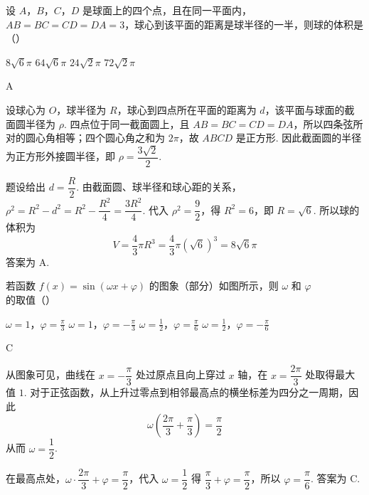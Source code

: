 \begin{problem}
设 \(A\)，\(B\)，\(C\)，\(D\) 是球面上的四个点，且在同一平面内，\(AB = BC = CD = DA = 3\)，球心到该平面的距离是球半径的一半，则球的体积是（\quad）

\choices
    {\(8\sqrt{6}\pi\)}
    {\(64\sqrt{6}\pi\)}
    {\(24\sqrt{2}\pi\)}
    {\(72\sqrt{2}\pi\)}
\end{problem}

\begin{answer}A\end{answer}

\begin{solution}
设球心为 \(O\)，球半径为 \(R\)，球心到四点所在平面的距离为 \(d\)，该平面与球面的截面圆半径为 \(\rho\). 四点位于同一截面圆上，且 \(AB=BC=CD=DA\)，所以四条弦所对的圆心角相等；四个圆心角之和为 \(2\pi\)，故 \(ABCD\) 是正方形. 因此截面圆的半径为正方形外接圆半径，即
\(\rho=\dfrac{3\sqrt2}{2}\).

题设给出 \(d=\dfrac{R}{2}\). 由截面圆、球半径和球心距的关系，
\(\rho^2=R^2-d^2=R^2-\dfrac{R^2}{4}=\dfrac{3R^2}{4}\). 代入 \(\rho^2=\dfrac92\)，得 \(R^2=6\)，即 \(R=\sqrt6\). 所以球的体积为
\[
V=\frac43\pi R^3=\frac43\pi(\sqrt6)^3=8\sqrt6\pi
\]
答案为 A.
\end{solution}

\begin{problem}
若函数 \( f(x) = \sin (\omega x + \varphi) \) 的图象（部分）如图所示，则 \( \omega \) 和 \( \varphi \) 的取值（\quad）


\choices
    {\(\omega = 1\)，\(\varphi = \frac{\pi}{3}\)}
    {\(\omega = 1\)，\(\varphi = -\frac{\pi}{3}\)}
    {\(\omega = \frac{1}{2}\)，\(\varphi = \frac{\pi}{6}\)}
    {\(\omega = \frac{1}{2}\)，\(\varphi = -\frac{\pi}{6}\)}
\end{problem}

\begin{answer}C\end{answer}

\begin{solution}
从图象可见，曲线在 \(x=-\dfrac\pi3\) 处过原点且向上穿过 \(x\) 轴，在 \(x=\dfrac{2\pi}{3}\) 处取得最大值 \(1\). 对于正弦函数，从上升过零点到相邻最高点的横坐标差为四分之一周期，因此
\[
\omega\left(\frac{2\pi}{3}+\frac\pi3\right)=\frac\pi2
\]
从而 \(\omega=\dfrac12\).

在最高点处，\(\omega\cdot\dfrac{2\pi}{3}+\varphi=\dfrac\pi2\)，代入 \(\omega=\dfrac12\) 得
\(\dfrac\pi3+\varphi=\dfrac\pi2\)，所以 \(\varphi=\dfrac\pi6\). 答案为 C.
\end{solution}

